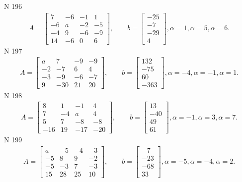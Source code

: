 \documentclass[11pt]{report}
\begin{document}
N 196
\begin{align*}
 A = \left[\begin{matrix}7 & -6 & -1 & 1\\-6 & a & -2 & -5\\-4 & 9 & -6 & -9\\14 & -6 & 0 & 6\end{matrix}\right],
    \qquad b = \left[\begin{matrix}-25\\-7\\-29\\4\end{matrix}\right], \alpha = 1, \alpha = 5, \alpha = 6. 
 \end{align*}
N 197
\begin{align*}
 A = \left[\begin{matrix}a & 7 & -9 & -9\\-2 & -7 & 6 & 4\\-3 & -9 & -6 & -7\\9 & -30 & 21 & 20\end{matrix}\right],
    \qquad b = \left[\begin{matrix}132\\-75\\60\\-363\end{matrix}\right], \alpha = -4, \alpha = -1, \alpha = 1. 
 \end{align*}
N 198
\begin{align*}
 A = \left[\begin{matrix}8 & 1 & -1 & 4\\7 & -4 & a & 4\\5 & 7 & -8 & -8\\-16 & 19 & -17 & -20\end{matrix}\right],
    \qquad b = \left[\begin{matrix}13\\-40\\49\\61\end{matrix}\right], \alpha = -1, \alpha = 3, \alpha = 7. 
 \end{align*}
N 199
\begin{align*}
 A = \left[\begin{matrix}a & -5 & -4 & -3\\-5 & 8 & 9 & -2\\-5 & -3 & 7 & -3\\15 & 28 & 25 & 10\end{matrix}\right],
    \qquad b = \left[\begin{matrix}-7\\-23\\-68\\33\end{matrix}\right], \alpha = -5, \alpha = -4, \alpha = 2. 
 \end{align*}
\end{document}
